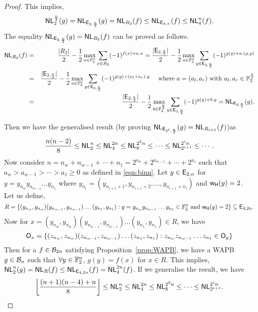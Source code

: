\documentclass{llncs}
\begin{document}
\begin{proof}
This implies, 
$$\mathsf{NL}_{2}^{\frac{n}{2}}(g) = \mathsf{NL}_{\mathsf{E}_{2,\frac{n}{2}}}(g) = \mathsf{NL}_{R_2}(f) \leq \mathsf{NL}_{\mathsf{E}_{4,n}}(f) \leq \mathsf{NL}_{4}^{n}(f).$$ 
The equality $\mathsf{NL}_{\mathsf{E}_{2,\frac{n}{2}}}(g) = \mathsf{NL}_{R_2}(f)$ can be proved as follows.
\begin{eqnarray*}
\mathsf{NL}_{R_2}(f) & = & \frac{|R_2|}{2} - \frac{1}{2}\max\limits_{a \in \mathbb{F}_2^n}{\sum\limits_{x\in R_2} (-1)^{f(x)+a.x}} 
= \frac{|\mathsf{E}_{2,\frac{n}{2}}|}{2} - \frac{1}{2}\max\limits_{a \in \mathbb{F}_2^n}{\sum\limits_{y \in \mathsf{E}_{2,\frac{n}{2}}} (-1)^{g(y)+a.(y,y)}} \\
& = & \frac{|\mathsf{E}_{2,\frac{n}{2}}|}{2} - \frac{1}{2}\max\limits_{a \in \mathbb{F}_2^n}{\sum\limits_{y \in \mathsf{E}_{2,\frac{n}{2}}} (-1)^{g(y)+(a_l+a_r).y}} ~~~\text{ where } a = (a_l,a_r)\text{ with } a_l,a_r \in \mathbb{F}_2^{\frac{n}{2}}\\
& = & \frac{|\mathsf{E}_{2,\frac{n}{2}}|}{2} - \frac{1}{2}\max\limits_{b \in \mathbb{F}_2^{\frac{n}{2}}}{\sum\limits_{y \in \mathsf{E}_{2,\frac{n}{2}}} (-1)^{g(y)+b.y}} = \mathsf{NL}_{\mathsf{E}_{2,\frac{n}{2}}}(g).
\end{eqnarray*}


Then we have the generalised result (by proving $\mathsf{NL}_{\mathsf{E}_{2^t,\frac{n}{2}}}(g) = \mathsf{NL}_{R_{t+1}}(f)$)as
$$ \frac{n(n-2)}{8} \leq \mathsf{NL}_{2}^n \leq \mathsf{NL}_{4}^{2n} \leq \mathsf{NL}_{8}^{2^{2}n } \leq \cdots \leq \mathsf{NL}_{2^{i+1}}^{2^{i}n} \leq \cdots.$$ 
Now consider $n = n_w + n _{w-1} + \cdots + n_1 = 2^{a_w} + 2^{a_{w-1}} + \cdots + 2^{a_1}$ such that $ a_w > a_{w-1} > \cdots > a_1 \geq 0$ as defined in \ref{eqn:binn}. Let $y \in \mathsf{E}_{2,n}$ for  $y = y_{n_w} y_{n_{w-1}} \ldots y_{n_1}$ where $y_{n_i} = (y_{n_{i+1}+1},y_{n_{i+1}+2},\ldots , y_{n_{i+1}+n_i})$ and $\mathsf{w_H}(y)=2$. Let us define, $$R =\{(y_{n_w},y_{n_w})(y_{n_{w-1}},y_{n_{w-1}})\ldots (y_{n_1},y_{n_1}) : y = y_{n_w} y_{n_{w-1}} \ldots y_{n_1} \in \mathbb{F}_2^{n} \text{ and } \mathsf{w_H}(y) = 2 \} \subseteq \mathsf{E}_{4,2n}.$$ Now for $x =  (y_{n_w},y_{n_w})(y_{n_{w-1}},y_{n_{w-1}})\ldots (y_{n_1},y_{n_1}) \in R $, we have
$$ \mathsf{O}_x = \{(z_{n_w}, z_{n_w})(z_{n_{w-1}},z_{n_{w-1}})\ldots (z_{n_1},z_{n_1}) : z_{n_w} z_{n_{w-1}} \ldots z_{n_1} \in \mathsf{O}_y\}$$
 Then for a $ f \in \mathcal{B}_{2n}$ satisfying Proposition~\ref{prop:WAPB}, we have a WAPB $g \in \mathcal{B}_{n}$  such that $\forall y \in \mathbb{F}_2^{n}$,  $g(y) = f(x)$ for $ x \in R$. This implies, $\mathsf{NL}_{2}^{n}(g) = \mathsf{NL}_{R}(f) \leq \mathsf{NL}_{\mathsf{E}_{4,2n}}(f) = \mathsf{NL}_{4}^{2n}(f)$. If we generalise the result, we have
$$ \left\lfloor \frac{(n+1)(n-4)+n}{8}  \right\rfloor \leq \mathsf{NL}_{2}^n \leq \mathsf{NL}_{4}^{2n} \leq \mathsf{NL}_{8}^{2^{2}n } \leq \cdots \leq \mathsf{NL}_{2^{i+1}}^{2^{i}n}.$$
\end{proof}
\end{document}
